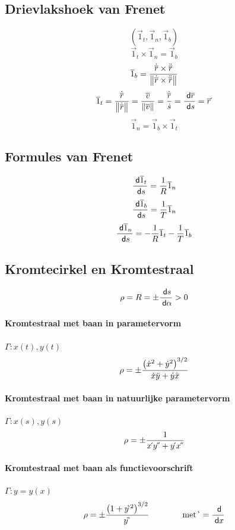 \subsection{Drievlakshoek van Frenet}
\label{sec:DrievlakshoekFrenet}
\[
  \left( \vec{1}_t , \vec{1}_n , \vec{1}_b\right)
\]
\[
  \vec{1}_t \times \vec{1}_n = \vec{1}_b
\]
\[
  \overline{1}_b = \frac{\dot{\overline{r}} \times \ddot{\overline{r}}}{\left\| \dot{\overline{r}} \times \ddot{\overline{r}} \right\|}
\]
\[
  \overline{1}_t = \frac{\dot{\overline{r}}}{\left\| \dot{\overline{r}} \right\|}
            = \frac{\overline{v}}{\left\| \overline{v} \right\|}
            = \frac{\dot{\overline{r}}}{\dot{s}}
            = \frac{\;\textsf{d}\overline{r}}{\;\textsf{d}s}
            = \overline{r} \acute{}\,
\]
\[
  \vec{1}_n = \vec{1}_b \times \vec{1}_t
\]

\subsection{Formules van Frenet}
\label{sec:FormulesFrenet}
\[
  \frac{\;\textsf{d}\overline{1}_t}{\;\textsf{d}s} = \frac{1}{R}\overline{1}_n
\]
\[
  \frac{\;\textsf{d}\overline{1}_b}{\;\textsf{d}s} = \frac{1}{T}\overline{1}_n
\]
\[
  \frac{\;\textsf{d}\overline{1}_n}{\;\textsf{d}s} = - \frac{1}{R} \overline{1}_t - \frac{1}{T} \overline{1}_b
\]

\subsection{Kromtecirkel en Kromtestraal}
\label{sec:KromtecirkelEnKromtestraal}
\[
 \rho = R = \pm \frac{\;\textsf{d}s}{\;\textsf{d}\alpha} > 0
\]

\paragraph{Kromtestraal met baan in parametervorm}
\label{sec:KromtestraalParametervorm}
$\Gamma : x\left(t\right), y\left(t\right)$
\[
  \rho = \pm \frac{\left(\dot{x}^2 + \dot{y}^2\right)^{3/2}}{\dot{x}\ddot{y} + \dot{y}\ddot{x}}
\]

\paragraph{Kromtestraal met baan in natuurlijke parametervorm}
\label{sec:KromtestraalNatuurlijkeParametervorm}
$\Gamma : x\left(s\right), y\left(s\right)$
\[
  \rho = \pm \frac{1}{x \acute{}\,y \acute{}\, \acute{}\, + y \acute{}\,x \acute{}\, \acute{}\,}
\]

\paragraph{Kromtestraal met baan als functievoorschrift}
\label{sec:KromtestraalFunctievorm}
$\Gamma : y = y\left( x \right)$
\[
  \rho = \pm \frac{\left(1 +y \grave{}\,^2\right)^{3/2}}{y \grave{} \, \grave{}\,} \qquad \qquad \mbox{met } \grave{}\, = \frac{\;\textsf{d}}{\;\textsf{d}x}
\]

